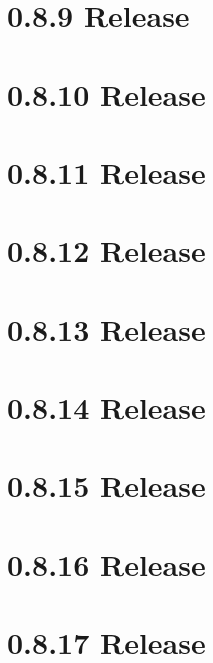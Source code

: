 \let\mypdfximage\pdfximage\def\pdfximage{\immediate\mypdfximage}\documentclass[twoside]{book}
\newcommand{\+}{\discretionary{\mbox{\scriptsize$\hookleftarrow$}}{}{}}
\begin{document}
\chapter{0.8.9 Release}
\label{doc_news_2014-11-04_0_8_9_md}

\chapter{0.8.10 Release}
\label{doc_news_2014-12-02_0_8_10_md}

\chapter{0.8.11 Release}
\label{doc_news_2015-04-03_0_8_11_md}

\chapter{0.8.12 Release}
\label{doc_news_2015-07-13_0_8_12_md}

\chapter{0.8.13 Release}
\label{doc_news_2015-09-17_0_8_13_md}

\chapter{0.8.14 Release}
\label{doc_news_2015-11-19_0_8_14_md}

\chapter{0.8.15 Release}
\label{doc_news_2016-02-16_0_8_15_md}

\chapter{0.8.16 Release}
\label{doc_news_2016-04-29_0_8_16_md}

\chapter{0.8.17 Release}
\label{doc_news_2016-06-14_0_8_17_md}

\end{document}

